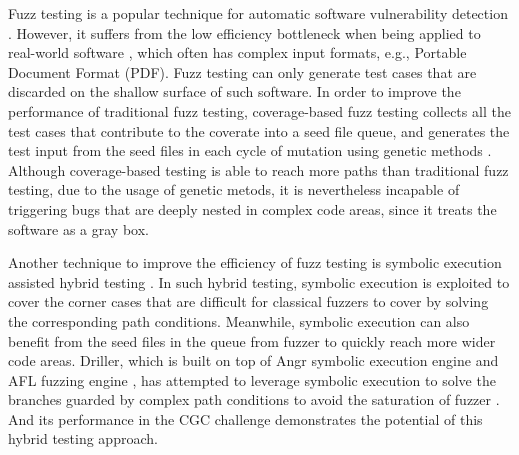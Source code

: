 

Fuzz testing is a popular technique for automatic software vulnerability detection 
 \cite{Miller:Fuzz, 5010257, sutton2007fuzzing}.
 However, it suffers from the low efficiency bottleneck when being applied to real-world software 
 \cite{neystadt2008automated, godefroid2008automating, ganesh2009taint, cadar2011symbolic, rawat2017vuzzer, stephens2016driller},
  which often has complex input formats, e.g., Portable Document Format (PDF).
  Fuzz testing can only generate test cases that are discarded on the shallow surface of such software.
  In order to improve the performance of traditional fuzz testing, 
  coverage-based fuzz testing collects all the test cases that contribute to the coverate into a seed file queue,
  and generates the test input from the seed files in each cycle of mutation using genetic methods
  \cite{rawat2017vuzzer, online:afl, stephens2016driller}.
  Although coverage-based testing is able to reach more paths than traditional fuzz testing, 
  due to the usage of genetic metods,
  it is nevertheless incapable of triggering bugs that are deeply nested in complex code areas,
  since it treats the software as a gray box.
  



Another technique to improve the efficiency of fuzz testing is symbolic execution assisted hybrid testing \cite{yeh2015craxfuzz, majumdar2007hybrid, pak2012hybrid}.
 In such hybrid testing, symbolic execution is exploited to cover the corner cases that are difficult for classical fuzzers to cover by solving the corresponding path conditions.
 Meanwhile, symbolic execution can also benefit from the seed files in the queue from fuzzer 
 to quickly reach more wider code areas. 
 Driller, which is built on top of Angr symbolic execution engine \cite{Shoshitaishvili_firmalice-automatic} and AFL fuzzing engine \cite{online:afl}, 
 has attempted to leverage symbolic execution to solve the branches guarded 
 by complex path conditions to avoid the saturation of fuzzer \cite{stephens2016driller}. 
 And its performance in the CGC challenge \cite{online:CGC} demonstrates the potential of this hybrid testing approach.

